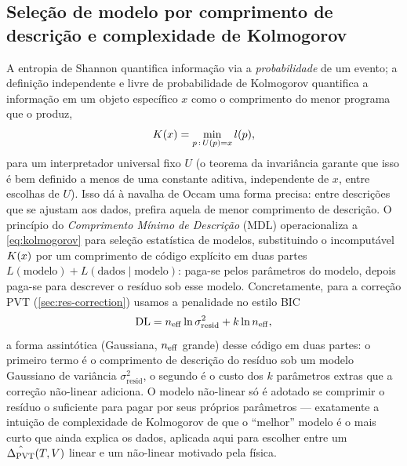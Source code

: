\subsection{Seleção de modelo por comprimento de descrição e complexidade de Kolmogorov}
\label{sec:th-mdl}
A entropia de Shannon quantifica informação via a \emph{probabilidade} de um
evento; a definição independente e livre de probabilidade de Kolmogorov
\cite{kolmogorov1965} quantifica a informação em um objeto específico $x$
como o comprimento do menor programa que o produz,
\begin{equation}
  K\!\left(x\right) = \min_{p\,:\,U(p)=x} l(p),
  \label{eq:kolmogorov}
\end{equation}
para um interpretador universal fixo $U$ (o teorema da invariância garante
que isso é bem definido a menos de uma constante aditiva, independente de
$x$, entre escolhas de $U$). Isso dá à navalha de Occam uma forma precisa:
entre descrições que se ajustam aos dados, prefira aquela de menor
comprimento de descrição. O princípio do \emph{Comprimento Mínimo de
Descrição} (MDL) \cite{rissanen1978} operacionaliza a \cref{eq:kolmogorov}
para seleção estatística de modelos, substituindo o incomputável $K\!\left(x\right)$
por um comprimento de código explícito em duas partes
$L(\text{modelo})+L(\text{dados}\mid\text{modelo})$: paga-se pelos
parâmetros do modelo, depois paga-se para descrever o resíduo sob esse
modelo. Concretamente, para a correção PVT (\cref{sec:res-correction})
usamos a penalidade no estilo BIC
\begin{equation}
  \mathrm{DL} = n_{\mathrm{eff}}\ln\sigma^2_{\text{resid}} + k\ln n_{\mathrm{eff}} ,
  \label{eq:mdl}
\end{equation}
a forma assintótica (Gaussiana, $n_{\mathrm{eff}}$ grande) desse código em duas partes:
o primeiro termo é o comprimento de descrição do resíduo sob um modelo
Gaussiano de variância $\sigma^2_{\text{resid}}$, o segundo é o custo dos $k$
parâmetros extras que a correção não-linear adiciona. O modelo não-linear só
é adotado se comprimir o resíduo o suficiente para pagar por seus próprios
parâmetros --- exatamente a intuição de complexidade de Kolmogorov de que o
``melhor'' modelo é o mais curto que ainda explica os dados, aplicada aqui
para escolher entre um $\hat{\Delta_{\mathrm{PVT}}}(T,V)$ linear e um não-linear
motivado pela física.

